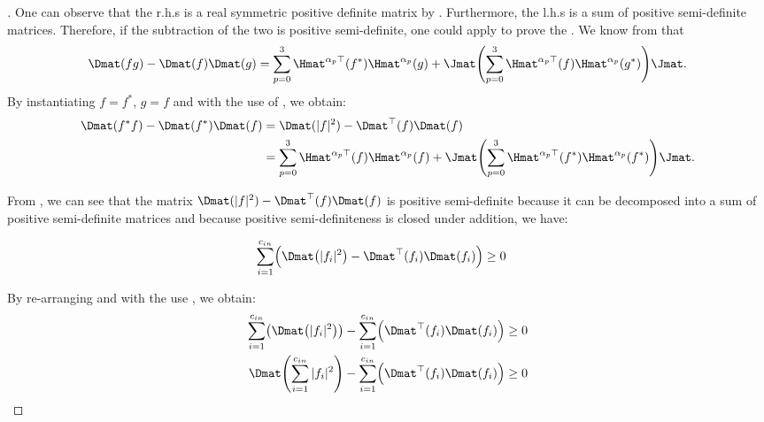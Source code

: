 \begin{proof}[]
\noindent
One can observe that the r.h.s is a real symmetric positive definite matrix by . Furthermore, the l.h.s is a sum of positive semi-definite matrices. Therefore, if the subtraction of the two is positive semi-definite, one could apply  to prove the . 
We know from  that 
\begin{equation}
    \Dmat(fg) - \Dmat(f)\Dmat(g) = \sum_{p=0}^3 \Hmat^{\alpha_p \top}(f^*) \Hmat^{\alpha_p}(g) + \Jmat \left( \sum_{p=0}^3 \Hmat^{\alpha_p \top}(f) \Hmat^{\alpha_p}(g^*) \right) \Jmat.
\end{equation}
By instantiating $f = f^*$, $g = f$ and with the use of , we obtain:
\begin{align} \label{equation:widom_identity_block_topelitz}
  \Dmat(f^* f) - \Dmat(f^*)\Dmat(f)
  &= \Dmat(|f|^2) - \Dmat^{\top}(f)\Dmat(f) \\
  &= \sum_{p=0}^3 \Hmat^{\alpha_p \top}(f)\Hmat^{\alpha_p}(f) + \Jmat \left( \sum_{p=0}^3 \Hmat^{\alpha_p \top}(f^*)\Hmat^{\alpha_p} (f^*) \right) \Jmat .
\end{align}

\noindent
From , we can see that the matrix $\Dmat(|f|^2) - \Dmat^{\top}(f)\Dmat(f)$
is positive semi-definite because it can be decomposed into a sum of positive semi-definite matrices and because positive semi-definiteness is closed under addition, we have:

\begin{align}
    \sum_{i=1}^{\cin} \leftmat \Dmat \left( |f_i|^2 \right) - \Dmat^{\top} \left(f_i \right) \Dmat (f_i) \rightmat &\geq 0
\end{align}

\noindent
By re-arranging and with the use , we obtain:
\begin{align}
   \sum_{i=1}^{\cin} \leftmat \Dmat \left( |f_i|^2 \right) \rightmat - \sum_{i=1}^{\cin} \leftmat \Dmat^{\top} \left(f_i \right) \Dmat (f_i) \rightmat &\geq 0 \\
    \Dmat \left( \sum_{i=1}^{\cin} |f_i|^2 \right) - \sum_{i=1}^{\cin} \leftmat \Dmat^{\top} \left(f_i \right) \Dmat (f_i) \rightmat &\geq 0
\end{align}


\end{proof}
